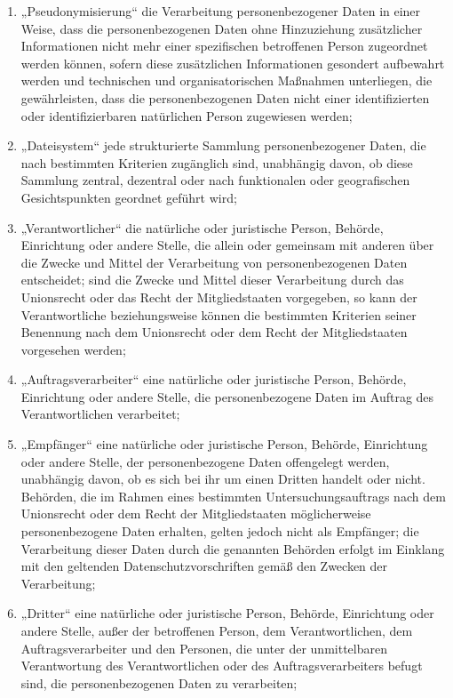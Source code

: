 \begin{enumerate}
  \item „Pseudonymisierung“ die Verarbeitung personenbezogener Daten in einer Weise, dass die personenbezogenen Daten
   ohne Hinzuziehung zusätzlicher Informationen nicht mehr einer spezifischen betroffenen Person zugeordnet werden
   können, sofern diese zusätzlichen Informationen gesondert aufbewahrt werden und technischen und organisatorischen
   Maßnahmen unterliegen, die gewährleisten, dass die personenbezogenen Daten nicht einer identifizierten oder
   identifizierbaren natürlichen Person zugewiesen werden;
  \label{itm:04-5}

  \item „Dateisystem“ jede strukturierte Sammlung personenbezogener Daten, die nach bestimmten Kriterien zugänglich
   sind, unabhängig davon, ob diese Sammlung zentral, dezentral oder nach funktionalen oder geografischen
   Gesichtspunkten geordnet geführt wird;
  \label{itm:04-6}

  \item „Verantwortlicher“ die natürliche oder juristische Person, Behörde, Einrichtung oder andere Stelle, die allein
   oder gemeinsam mit anderen über die Zwecke und Mittel der Verarbeitung von personenbezogenen Daten entscheidet; sind
   die Zwecke und Mittel dieser Verarbeitung durch das Unionsrecht oder das Recht der Mitgliedstaaten vorgegeben, so
   kann der Verantwortliche beziehungsweise können die bestimmten Kriterien seiner Benennung nach dem Unionsrecht oder
   dem Recht der Mitgliedstaaten vorgesehen werden;
  \label{itm:04-7}

  \item „Auftragsverarbeiter“ eine natürliche oder juristische Person, Behörde, Einrichtung oder andere Stelle, die
   personenbezogene Daten im Auftrag des Verantwortlichen verarbeitet;
  \label{itm:04-8}

  \item „Empfänger“ eine natürliche oder juristische Person, Behörde, Einrichtung oder andere Stelle, der
   personenbezogene Daten offengelegt werden, unabhängig davon, ob es sich bei ihr um einen Dritten handelt oder nicht.
   Behörden, die im Rahmen eines bestimmten Untersuchungsauftrags nach dem Unionsrecht oder dem Recht der
   Mitgliedstaaten möglicherweise personenbezogene Daten erhalten, gelten jedoch nicht als Empfänger; die Verarbeitung
   dieser Daten durch die genannten Behörden erfolgt im Einklang mit den geltenden Datenschutzvorschriften gemäß den
   Zwecken der Verarbeitung;
  \label{itm:04-9}

  \item „Dritter“ eine natürliche oder juristische Person, Behörde, Einrichtung oder andere Stelle, außer der
   betroffenen Person, dem Verantwortlichen, dem Auftragsverarbeiter und den Personen, die unter der unmittelbaren
   Verantwortung des Verantwortlichen oder des Auftragsverarbeiters befugt sind, die personenbezogenen Daten zu
   verarbeiten;
  \label{itm:04-10}


\end{enumerate}
